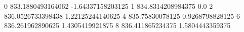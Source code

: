 0 833.1880493164062 -1.64337158203125
1 834.8314208984375 0.0
2 836.0526733398438 1.22125244140625
4 835.75830078125 0.9268798828125
6 836.261962890625 1.4305419921875
8 836.411865234375 1.5804443359375
